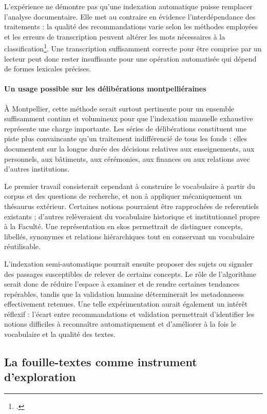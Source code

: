 L'expérience ne démontre pas qu'une indexation automatique puisse remplacer l'analyse documentaire. Elle met au contraire en évidence l'interdépendance des traitements : la qualité des recommandations varie selon les méthodes employées et les erreurs de transcription peuvent altérer les mots nécessaires à la classification\footcite{RomeinVeldhoenRomein2026}. Une transcription suffisamment correcte pour être comprise par un lecteur peut donc rester insuffisante pour une opération automatisée qui dépend de formes lexicales précises.

\paragraph{Un usage possible sur les délibérations montpelliéraines}

À Montpellier, cette méthode serait surtout pertinente pour un ensemble suffisamment continu et volumineux pour que l'indexation manuelle exhaustive représente une charge importante. Les séries de délibérations constituent une piste plus convaincante qu'un traitement indifférencié de tous les fonds : elles documentent sur la longue durée des décisions relatives aux enseignements, aux personnels, aux bâtiments, aux cérémonies, aux finances ou aux relations avec d'autres institutions.

Le premier travail consisterait cependant à construire le vocabulaire à partir du corpus et des questions de recherche, et non à appliquer mécaniquement un thésaurus extérieur. Certaines notions pourraient être rapprochées de \glspl{referentiel} existants ; d'autres relèveraient du vocabulaire historique et institutionnel propre à la Faculté. Une représentation en \gls{skos} permettrait de distinguer concepts, libellés, synonymes et relations hiérarchiques tout en conservant un vocabulaire réutilisable.

L'indexation semi-automatique pourrait ensuite proposer des sujets ou signaler des passages susceptibles de relever de certains concepts. Le rôle de l'algorithme serait donc de réduire l'espace à examiner et de rendre certaines tendances repérables, tandis que la validation humaine déterminerait les \glspl{metadonnees} effectivement retenues. Une telle expérimentation aurait également un intérêt réflexif : l'écart entre recommandations et validation permettrait d'identifier les notions difficiles à reconnaître automatiquement et d'améliorer à la fois le vocabulaire et la qualité des textes.


\subsection{La \gls{fouille-textes} comme instrument d'exploration}

